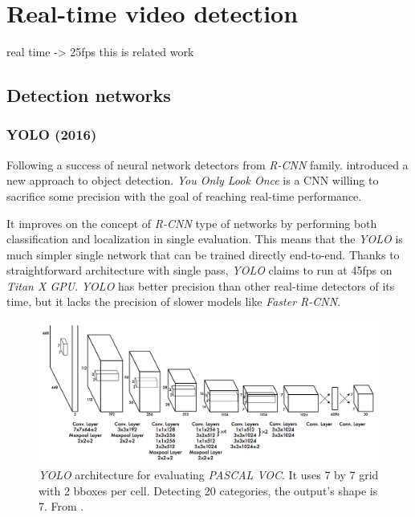 
\chapter{Real-time video detection}
\label{chap:rltm}

real time -> 25fps
this is related work

\section{Detection networks}
\subsection{YOLO (2016)}
Following a success of neural network detectors from \textit{R-CNN} family. \citeauthor{bib:yolo} \cite{bib:yolo} introduced a new approach to object detection. \textit{You Only Look Once} is a CNN willing to sacrifice some precision with the goal of reaching real-time performance. 

It improves on the concept of \textit{R-CNN} type of networks by performing both classification and localization in single evaluation. This means that the \textit{YOLO} is much simpler single network that can be trained directly end-to-end. Thanks to straightforward architecture with single pass, \textit{YOLO} claims to run at 45fps on \textit{Titan X GPU}. \textit{YOLO} has better precision than other real-time detectors of its time, but it lacks the precision of slower models like \textit{Faster R-CNN}.

\begin{figure}
    \centering
    \includegraphics[width=\textwidth]{img/yoylo}
    \caption{\textit{YOLO} architecture for evaluating \textit{PASCAL VOC}. It uses 7 by 7 grid with 2 bboxes per cell. Detecting 20 categories, the output's shape is 7. From \cite[fig. 3]{bib:yolo}.}
    \label{fig:yolo} 
\end{figure}


